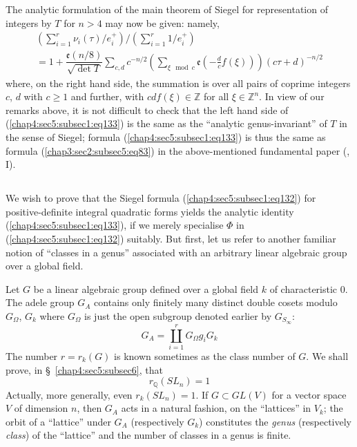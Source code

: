 The analytic formulation of the main theorem of Siegel for
representation of integers by $T$ for $n>4$ may now be given: namely,
\begin{multline*}
  \left(\sum^{r}_{i=1}\nu_{i}(\tau)/e^{+}_{i}\right)/
  \left(\sum^{r}_{i=1}1/e^{+}_{i}\right)\\
  =1+\dfrac{\mathfrak{e}(n/8)}{\sqrt{\det
      T}}\sum_{c,d}c^{-n/2}\left(\sum_{\xi \mod
    c}\mathfrak{e}\left(-\frac{d}{c}f(\xi)\right)\right)
  (c\tau+d)^{-n/2}\tag{133}\label{chap4:sec5:subsec1:eq133} 
\end{multline*}
where, on the right hand side, the summation is over all pairs of
coprime integers $c$, $d$ with $c\geq 1$ and further, with
$cdf(\xi)\in\mathbb{Z}$ for all $\xi\in \mathbb{Z}^{n}$. In view of
our remarks above, it is not difficult to check that the left hand
side of (\ref{chap4:sec5:subsec1:eq133}) is the same as the ``analytic genus-invariant'' of
$T$ in the sense of Siegel; formula (\ref{chap4:sec5:subsec1:eq133}) is thus the same as
formula (\ref{chap3:sec2:subsec5:eq83}) in the above-mentioned
fundamental paper  (\cite{Sie 1}, I).

\subsection{}\label{chap4:sec5:subsec2}%

We wish to prove that the Siegel formula (\ref{chap4:sec5:subsec1:eq132}) for
positive-definite integral quadratic forms yields the analytic
identity (\ref{chap4:sec5:subsec1:eq133}), if we merely specialise $\Phi$ in\pageoriginale
(\ref{chap4:sec5:subsec1:eq132}) suitably. But first, let us refer to another familiar
notion of ``classes in a genus'' associated with an arbitrary linear
algebraic group over a global field.

Let $G$ be a linear algebraic group defined over a global field $k$ of
characteristic $0$. The adele group $G_{A}$ contains only finitely
many distinct double cosets modulo $G_{\Omega}$, $G_{k}$ where
$G_{\Omega}$ is just the open subgroup denoted earlier by
$G_{S_{\infty}}$:
\begin{equation*}
  G_{A}=\coprod^{r}_{i=1}G_{\Omega}g_{i}G_{k}
  \tag{134}\label{chap4:sec5:subsec2:eq134}
\end{equation*}
The number $r=r_{k}(G)$ is known sometimes as the class number of
$G$. We shall prove, in \S\ \ref{chap4:sec5:subsec6}, that
\begin{equation*}
  r_{\mathbb{Q}}(SL_{n})=1\tag{135}\label{chap4:sec5:subsec2:eq135}
\end{equation*}
Actually, more generally, even $r_{k}(SL_{n})=1$. If $G\subset GL(V)$
for a vector space $V$ of dimension $n$, then $G_{A}$ acts in a
natural fashion, on the ``lattices'' in $V_{k}$; the orbit of a
``lattice'' under $G_{A}$ (respectively $G_{k}$) constitutes the {\em
  genus} (respectively {\em class}) of the ``lattice'' and the number
of classes in a genus is finite.

